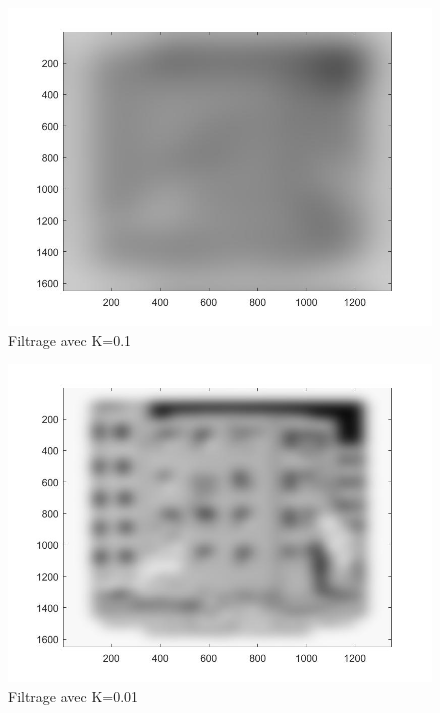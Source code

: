 \documentclass[10pt,a4paper]{article}
\begin{document}
\begin{figure}[H]	\begin{center}
\includegraphics[scale=0.35]{imfiltree_k=0.1.jpg}
\caption{Filtrage avec K=0.1}
\label{XX}
\end{center}	\end{figure}

\begin{figure}[H]	\begin{center}
\includegraphics[scale=0.35]{imfiltree_k=0.01.jpg}
\caption{Filtrage avec K=0.01}
\label{XX}
\end{center}	\end{figure}
\end{document}
